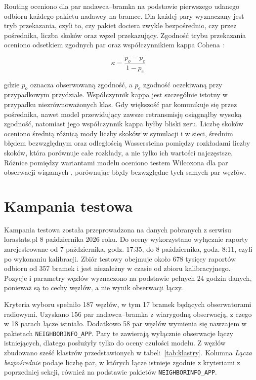 Routing oceniono dla par nadawca--bramka na podstawie pierwszego udanego odbioru każdego pakietu nadawcy na bramce. Dla każdej pary wyznaczany jest tryb przekazania, czyli to, czy pakiet dociera zwykle bezpośrednio, czy przez pośrednika, liczba skoków oraz węzeł przekazujący. Zgodność trybu przekazania oceniono odsetkiem zgodnych par oraz współczynnikiem kappa Cohena \cite{cohen1960}:

\begin{equation}\label{eq:kappa}
\kappa = \frac{p_o - p_e}{1 - p_e}
\end{equation}

gdzie \(p_o\) oznacza obserwowaną zgodność, a \(p_e\) zgodność oczekiwaną przy przypadkowym przydziale. Współczynnik kappa jest szczególnie istotny w przypadku niezrównoważonych klas. Gdy większość par komunikuje się przez pośrednika, nawet model przewidujący zawsze retransmisję osiągnąłby wysoką zgodność, natomiast jego współczynnik kappa byłby bliski zeru. Liczbę skoków oceniono średnią różnicą mody liczby skoków w symulacji i w sieci, średnim błędem bezwzględnym oraz odległością Wassersteina pomiędzy rozkładami liczby skoków, która porównuje całe rozkłady, a nie tylko ich wartości najczęstsze. Różnice pomiędzy wariantami modelu oceniono testem Wilcoxona dla par obserwacji wiązanych \cite{wilcoxon1945}, porównując błędy bezwzględne tych samych par węzłów.

\section{Kampania testowa}

Kampania testowa została przeprowadzona na danych pobranych z serwisu lorastats.pl 8 października 2026 roku. Do oceny wykorzystano wyłącznie raporty zarejestrowane od 7 października, godz. 17:35, do 8 października, godz. 8:11, czyli po wykonaniu kalibracji. Zbiór testowy obejmuje około 678 tysięcy raportów odbioru od 357 bramek i jest niezależny w czasie od zbioru kalibracyjnego. Pozycje i parametry węzłów wyznaczono na podstawie pełnych 24 godzin danych, ponieważ są to cechy węzłów, a nie wynik obserwacji łączy.

Kryteria wyboru spełniło 187 węzłów, w tym 17 bramek będących obserwatorami radiowymi. Uzyskano 156 par nadawca--bramka z wiarygodną obserwacją, z czego w 18 parach łącze istniało. Dodatkowo 58 par węzłów wymienia się nawzajem w pakietach \texttt{NEIGHBORINFO\_APP}. Pary te zawierają wyłącznie obserwacje łączy istniejących, dlatego posłużyły tylko do oceny czułości modelu. Z węzłów zbudowano sześć klastrów przedstawionych w tabeli~\ref{tab:klastry}. Kolumna \textit{Łącza bezpośrednie} podaje liczbę par, w których łącze istnieje zgodnie z kryteriami z poprzedniej sekcji, również na podstawie pakietów \texttt{NEIGHBORINFO\_APP}.

